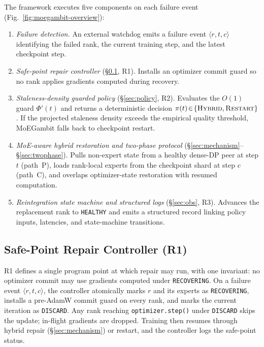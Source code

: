 \documentclass[10pt,conference]{IEEEtran}
\begin{document}
The framework executes five components on each failure event (Fig.~\ref{fig:moegambit-overview}):
\begin{enumerate}
    \item \emph{Failure detection.} An external watchdog emits a failure event $\langle r,t,c\rangle$ identifying the failed rank, the current training step, and the latest checkpoint step.
    \item \emph{Safe-point repair controller} (\S\ref{sec:safepoint}, R1). Installs an optimizer commit guard so no rank applies gradients computed during recovery.
    \item \emph{Staleness-density guarded policy} (\S\ref{sec:policy}, R2). Evaluates the $O(1)$ guard $\Phi'(t)$ and returns a deterministic decision $\pi(t)\!\in\!\{\textsc{Hybrid},\textsc{Restart}\}$. If the projected staleness density exceeds the empirical quality threshold, MoEGambit falls back to checkpoint restart.
    \item \emph{MoE-aware hybrid restoration and two-phase protocol} (\S\ref{sec:mechanism}--\S\ref{sec:twophase}). Pulls non-expert state from a healthy dense-DP peer at step $t$ (path~P), loads rank-local experts from the checkpoint shard at step $c$ (path~C), and overlaps optimizer-state restoration with resumed computation.
    \item \emph{Reintegration state machine and structured logs} (\S\ref{sec:obs}, R3). Advances the replacement rank to \texttt{HEALTHY} and emits a structured record linking policy inputs, latencies, and state-machine transitions.
\end{enumerate}

\subsection{Safe-Point Repair Controller (R1)}
\label{sec:safepoint}

R1 defines a single program point at which repair may run, with one invariant: no optimizer commit may use gradients computed under \texttt{RECOVERING}. On a failure event $\langle r,t,c\rangle$, the controller atomically marks $r$ and its experts as \texttt{RECOVERING}, installs a pre-AdamW commit guard on every rank, and marks the current iteration as \texttt{DISCARD}. Any rank reaching \texttt{optimizer.step()} under \texttt{DISCARD} skips the update; in-flight gradients are dropped. Training then resumes through hybrid repair (\S\ref{sec:mechanism}) or restart, and the controller logs the safe-point status.
\end{document}
